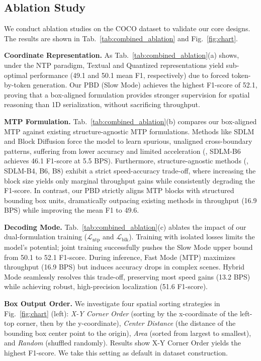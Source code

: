 


\vspace{-2mm}
\subsection{Ablation Study}
\vspace{-1mm}
We conduct ablation studies on the COCO dataset to validate our core designs. The results are shown in Tab.~\ref{tab:combined_ablation} and Fig.~\ref{fig:chart}.

\noindent\textbf{Coordinate Representation.} As Tab.~\ref{tab:combined_ablation}(a) shows, under the NTP paradigm, Textual and Quantized representations yield sub-optimal performance (49.1 and 50.1 mean F1, respectively) due to forced token-by-token generation. Our PBD (Slow Mode) achieves the highest F1-score of 52.1, proving that a box-aligned formulation provides stronger supervision for spatial reasoning than 1D serialization, without sacrificing throughput.

\noindent\textbf{MTP Formulation.} Tab.~\ref{tab:combined_ablation}(b) compares our box-aligned MTP against existing structure-agnostic MTP formulations. Methods like SDLM and Block Diffusion force the model to learn spurious, unaligned cross-boundary patterns, suffering from lower accuracy and limited acceleration (\eg, SDLM-B6 achieves 46.1 F1-score at 5.5 BPS). Furthermore, structure-agnostic methods (\eg, SDLM-B4, B6, B8) exhibit a strict speed-accuracy trade-off, where increasing the block size yields only marginal throughput gains while consistently degrading the F1-score. In contrast, our PBD strictly aligns MTP blocks with structured bounding box units, dramatically outpacing existing methods in throughput (16.9 BPS) while improving the mean F1 to 49.6.

\noindent\textbf{Decoding Mode.} Tab.~\ref{tab:combined_ablation}(c) ablates the impact of our dual-formulation training ($\mathcal{L}_{\mathrm{ntp}}$ and $\mathcal{L}_{\mathrm{blk}}$). Training with isolated losses limits the model's potential; joint training successfully pushes the Slow Mode upper bound from 50.1 to 52.1 F1-score. During inference, Fast Mode (MTP) maximizes throughput (16.9 BPS) but induces accuracy drops in complex scenes. Hybrid Mode seamlessly resolves this trade-off, preserving most speed gains (13.2 BPS) while achieving robust, high-precision localization (51.6 F1-score).



\noindent\textbf{Box Output Order.} We investigate four spatial sorting strategies in Fig.~\ref{fig:chart} (left): \textit{X-Y Corner Order} (sorting by the x-coordinate of the left-top corner, then by the y-coordinate), \textit{Center Distance} (the distance of the bounding box center point to the origin), \textit{Area} (sorted from largest to smallest), and \textit{Random} (shuffled randomly). Results show X-Y Corner Order yields the highest F1-score. We take this setting as  default in dataset construction.

